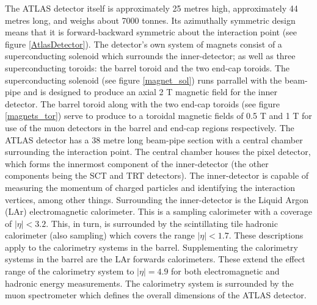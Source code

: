 The ATLAS detector itself is approximately 25 metres high, approximately 44 metres long, and weighs about 7000 tonnes. Its azimuthally symmetric design means that it is forward-backward symmetric about the interaction point (see figure \ref{AtlasDetector}). The detector's own system of magnets consist of a superconducting solenoid which surrounds the inner-detector; as well as three superconducting toroids: the barrel toroid and the two end-cap toroids. The superconducting solenoid (see figure \ref{magnet_sol}) runs parrallel with the beam-pipe and is designed to produce an axial 2 T magnetic field for the inner detector. The barrel toroid along with the two end-cap toroids (see figure \ref{magnets_tor}) serve to produce to a toroidal magnetic fields of 0.5 T and 1 T for use of the muon detectors in the barrel and end-cap regions respectively. The ATLAS detector has a 38 metre long beam-pipe section with a central chamber surrounding the interaction point. The central chamber houses the pixel detector, which forms the innermost component of the inner-detector (the other components being the SCT and TRT detectors). The inner-detector is capable of measuring the momentum of charged particles and identifying the interaction vertices, among other things. Surrounding the inner-detector is the Liquid Argon (LAr) electromagnetic calorimeter. This is a sampling calorimeter with a coverage of $|\eta | < 3.2$. This, in turn, is surrounded by the scintillating tile hadronic calorimeter (also sampling) which covers the range $ |\eta| < 1.7$. These descriptions apply to the calorimetry systems in the barrel. Supplementing the calorimetry systems in the barrel are the LAr forwards calorimeters. These extend the effect range of the calorimetry system to $ | \eta| = 4.9$ for both electromagnetic and hadronic energy measurements. The calorimetry system is surrounded by the muon spectrometer which defines the overall dimensions of the ATLAS detector.

